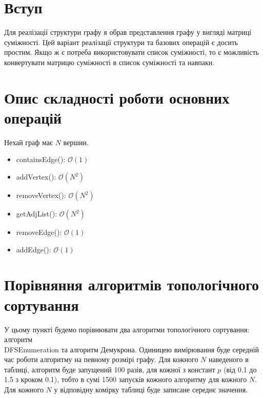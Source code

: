 \documentclass{article}
\begin{document}
\newpage
\section{Вступ}
\quad Для реалізації структури графу я обрав представлення графу у вигляді матриці суміжності. Цей варіант реалізації структури та базових операцій є досить простим. Якщо ж є потреба використовувати список суміжності, то є можливість конвертувати матрицю суміжності в список суміжності та навпаки.

\section{Опис складності роботи основних операцій}
\quad Нехай граф має \(N\) вершин.

\begin{itemize}
    \item containsEdge(): \(\mathcal{O}(1)\)
    \item addVertex(): \(\mathcal{O}(N^2)\)
    \item removeVertex(): \(\mathcal{O}(N^2)\)
    \item getAdjList(): \(\mathcal{O}(N^2)\)
    \item removeEdge(): \(\mathcal{O}(1)\)
    \item addEdge(): \(\mathcal{O}(1)\)
\end{itemize}

\section{Порівняння алгоритмів топологічного сортування}
\quad У цьому пункті будемо порівнювати два алгоритми топологічного сортування: алгоритм 
\\DFSEnumeration та  алгоритм Демукрона. Одиницею вимірювання буде середній час роботи алгоритму на певному розмірі графу. Для кожного \(N\) наведеного в таблиці, алгоритм буде запущений 100 разів, для кожної з констант \(p\) (від 0.1 до 1.5 з кроком 0.1), тобто в сумі 1500 запусків кожного алгоритму для кожного \(N\). Для кожного \(N\) у відповідну комірку таблиці буде записане середнє значення. 
\end{document}
